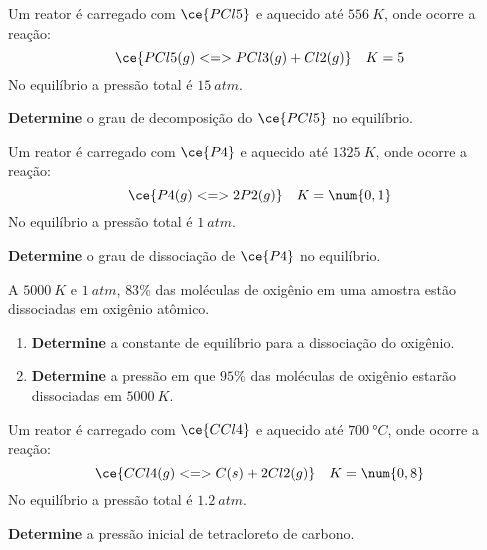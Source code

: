 \begin{problem}[
	id={2F41},
	path={/home/braun/Documents/Developer/braunchem/data/problems/Q2/2F/2F41}
]
Um reator é carregado com {\(\ce{PCl5}\)} e aquecido até {\(\qty{556}{\unit{K}}\)}, onde ocorre a reação: {\[
    \ce{ PCl5(g) <=> PCl3(g) + Cl2(g) } \quad K = 5
\]} No equilíbrio a pressão total é {\(\qty{15}{\unit{atm}}\)}.

\textbf{Determine} o grau de decomposição do {\(\ce{PCl5}\)} no equilíbrio.

\end{problem}


\begin{problem}[
	id={2F42},
	path={/home/braun/Documents/Developer/braunchem/data/problems/Q2/2F/2F42}
]
Um reator é carregado com {\(\ce{P4}\)} e aquecido até {\(\qty{1325}{\unit{K}}\)}, onde ocorre a reação: {\[
    \ce{ P4(g) <=> 2 P2(g) } \quad K = \num{0,1}
\]} No equilíbrio a pressão total é {\(\qty{1}{\unit{atm}}\)}.

\textbf{Determine} o grau de dissociação de {\(\ce{P4}\)} no equilíbrio.

\end{problem}


\begin{problem}[
	id={2F43},
	path={/home/braun/Documents/Developer/braunchem/data/problems/Q2/2F/2F43}
]
A {\(\qty{5000}{\unit{K}}\)} e {\(\qty{1}{\unit{atm}}\)}, {\(83\%\)} das moléculas de oxigênio em uma amostra estão dissociadas em oxigênio atômico.

\begin{enumerate}
\def\labelenumi{\alph{enumi}.}
\tightlist
\item
  \textbf{Determine} a constante de equilíbrio para a dissociação do oxigênio.
\item
  \textbf{Determine} a pressão em que {\(95\%\)} das moléculas de oxigênio estarão dissociadas em {\(\qty{5000}{\unit{K}}\)}.
\end{enumerate}

\end{problem}


\begin{problem}[
	id={2F44},
	path={/home/braun/Documents/Developer/braunchem/data/problems/Q2/2F/2F44}
]
Um reator é carregado com {\(\ce{CCl4}\)} e aquecido até {\(\qty{700}{\unit{\degree C}}\)}, onde ocorre a reação: {\[
    \ce{ CCl4(g) <=> C(s) + 2 Cl2(g) } \quad K = \num{0,8}
\]} No equilíbrio a pressão total é {\(\qty{1,2}{\unit{atm}}\)}.

\textbf{Determine} a pressão inicial de tetracloreto de carbono.

\end{problem}



